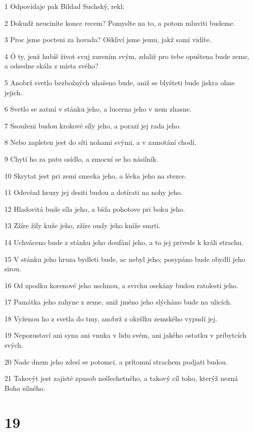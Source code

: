 \par 1 Odpovídaje pak Bildad Suchský, rekl:
\par 2 Dokudž neuciníte konce recem? Pomyslte na to, a potom mluviti budeme.
\par 3 Proc jsme pocteni za hovada? Oškliví jsme jemu, jakž sami vidíte.
\par 4 Ó ty, jenž hubíš život svuj zurením svým, zdaliž pro tebe opuštena bude zeme, a odsedne skála z místa svého?
\par 5 Anobrž svetlo bezbožných uhašeno bude, aniž se blyšteti bude jiskra ohne jejich.
\par 6 Svetlo se zatmí v stánku jeho, a lucerna jeho v nem zhasne.
\par 7 Ssouženi budou krokové síly jeho, a porazí jej rada jeho.
\par 8 Nebo zapleten jest do síti nohami svými, a v zamotání chodí.
\par 9 Chytí ho za patu osídlo, a zmocní se ho násilník.
\par 10 Skrytat jest pri zemi smecka jeho, a lécka jeho na stezce.
\par 11 Odevšad hruzy jej desiti budou a dotírati na nohy jeho.
\par 12 Hladovitá bude síla jeho, a bída pohotove pri boku jeho.
\par 13 Zžíre žily kuže jeho, zžíre oudy jeho kníže smrti.
\par 14 Uchváceno bude z stánku jeho doufání jeho, a to jej privede k králi strachu.
\par 15 V stánku jeho hruza bydleti bude, ac nebyl jeho; posypáno bude obydlí jeho sirou.
\par 16 Od zpodku korenové jeho uschnou, a svrchu osekány budou ratolesti jeho.
\par 17 Památka jeho zahyne z zeme, aniž jméno jeho slýcháno bude na ulicích.
\par 18 Vyženou ho z svetla do tmy, anobrž z okršlku zemského vypudí jej.
\par 19 Nepozustaví ani syna ani vnuka v lidu svém, ani jakého ostatku v príbytcích svých.
\par 20 Nade dnem jeho zdesí se potomci, a prítomní strachem podjati budou.
\par 21 Takovýt jest zajisté zpusob nešlechetného, a takový cíl toho, kterýž nezná Boha silného.

\chapter{19}

